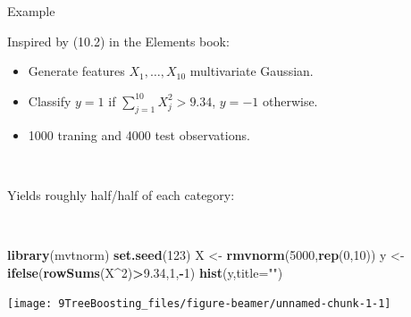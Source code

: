 \documentclass[
  10pt,
  ignorenonframetext,
]{beamer}
\newenvironment{Shaded}{\begin{snugshade}}{\end{snugshade}}
\newcommand{\AttributeTok}[1]{\textcolor[rgb]{0.13,0.29,0.53}{#1}}
\newcommand{\DecValTok}[1]{\textcolor[rgb]{0.00,0.00,0.81}{#1}}
\newcommand{\FloatTok}[1]{\textcolor[rgb]{0.00,0.00,0.81}{#1}}
\newcommand{\FunctionTok}[1]{\textcolor[rgb]{0.13,0.29,0.53}{\textbf{#1}}}
\newcommand{\NormalTok}[1]{#1}
\newcommand{\OtherTok}[1]{\textcolor[rgb]{0.56,0.35,0.01}{#1}}
\newcommand{\SpecialCharTok}[1]{\textcolor[rgb]{0.81,0.36,0.00}{\textbf{#1}}}
\newcommand{\StringTok}[1]{\textcolor[rgb]{0.31,0.60,0.02}{#1}}
\providecommand{\tightlist}{%
  \setlength{\itemsep}{0pt}\setlength{\parskip}{0pt}}
\begin{document}
\begin{frame}[fragile]
\begin{block}{Example}
\protect\hypertarget{example}{}
\(~\)

Inspired by (10.2) in the Elements book:

\vspace{2mm}

\begin{itemize}
\tightlist
\item
  Generate features \(X_1, \ldots, X_{10}\) multivariate Gaussian.
\item
  Classify \(y=1\) if \(\sum_{j=1}^{10}X_j^2 > 9.34\), \(y=-1\)
  otherwise.
\item
  1000 traning and 4000 test observations.
\end{itemize}

\(~\)

Yields roughly half/half of each category:

\(~\)

\scriptsize
\centering

\begin{Shaded}
\begin{Highlighting}[]
\FunctionTok{library}\NormalTok{(mvtnorm)}
\FunctionTok{set.seed}\NormalTok{(}\DecValTok{123}\NormalTok{)}
\NormalTok{X }\OtherTok{\textless{}{-}} \FunctionTok{rmvnorm}\NormalTok{(}\DecValTok{5000}\NormalTok{,}\FunctionTok{rep}\NormalTok{(}\DecValTok{0}\NormalTok{,}\DecValTok{10}\NormalTok{))}
\NormalTok{y }\OtherTok{\textless{}{-}} \FunctionTok{ifelse}\NormalTok{(}\FunctionTok{rowSums}\NormalTok{(X}\SpecialCharTok{\^{}}\DecValTok{2}\NormalTok{)}\SpecialCharTok{\textgreater{}}\FloatTok{9.34}\NormalTok{,}\DecValTok{1}\NormalTok{,}\SpecialCharTok{{-}}\DecValTok{1}\NormalTok{)}
\FunctionTok{hist}\NormalTok{(y,}\AttributeTok{title=}\StringTok{""}\NormalTok{)}
\end{Highlighting}
\end{Shaded}

\texttt{[image: 9TreeBoosting\_files/figure-beamer/unnamed-chunk-1-1]}
\end{block}
\end{frame}
\end{document}
